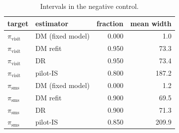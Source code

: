 \begin{table}[!htbp]
\centering
\caption{Intervals in the negative control.}
\label{tab:controlintervals}
\footnotesize
\begin{tabular}{llrr}
\toprule
target & estimator & fraction & mean width \\
\midrule
$\pi_{\mathrm{visit}}$ & DM (fixed model) & 0.000 & 1.0 \\
$\pi_{\mathrm{visit}}$ & DM refit & 0.950 & 73.3 \\
$\pi_{\mathrm{visit}}$ & DR & 0.950 & 73.4 \\
$\pi_{\mathrm{visit}}$ & pilot-IS & 0.800 & 187.2 \\
$\pi_{\mathrm{sms}}$ & DM (fixed model) & 0.000 & 1.2 \\
$\pi_{\mathrm{sms}}$ & DM refit & 0.900 & 69.5 \\
$\pi_{\mathrm{sms}}$ & DR & 0.900 & 71.3 \\
$\pi_{\mathrm{sms}}$ & pilot-IS & 0.850 & 209.9 \\
\bottomrule
\end{tabular}
\end{table}
